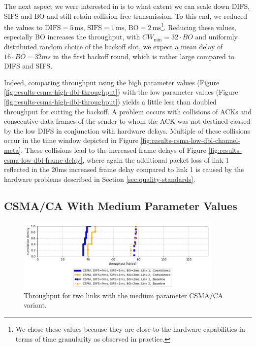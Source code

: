 The next aspect we were interested in is to what extent we can scale down DIFS, SIFS and BO and still retain collision-free transmission. To this end, we reduced the values to $\text{DIFS}=5 \,\text{ms}$, $\text{SIFS}=1 \,\text{ms}$, $\text{BO}=2 \,\text{ms}$\footnote{We chose these values because they are close to the hardware capabilities in terms of time granularity as observed in practice.}. Reducing these values, especially BO increases the throughput, with $CW_\text{min} = 32 \cdot BO$ and uniformly distributed random choice of the backoff slot, we expect a mean delay of $16\cdot BO=32ms$ in the first backoff round, which is rather large compared to DIFS and SIFS.

 Indeed, comparing throughput using the high parameter values (Figure \ref{fig:results-csma-high-dbl-throughput}) with the low parameter values (Figure \ref{fig:results-csma-high-dbl-throughput}) yields a little less than doubled throughput for cutting the backoff. 
 A problem occurs with collisions of ACKs and consecutive data frames of the sender to whom the ACK was not destined caused by the low DIFS in conjunction with hardware delays. Multiple of these collisions occur in the time window depicted in Figure \ref{fig:results-csma-low-dbl-channel-meta}. These collisions lead to the increased frame delays of Figure \ref{fig:results-csma-low-dbl-frame-delay}, where again the additional packet loss of link 1 reflected in the 20ms increased frame delay compared to link 1 is caused by the hardware problems described in Section \ref{sec:quality-standards}.

\clearpage

\subsection{CSMA/CA With Medium Parameter Values}

\begin{figure}[tb]
	\label{fig:results-csma-med-dbl-throughput}
	\begin{center}
		\includegraphics[width=0.9\textwidth]{pictures/results/same_combinations/csma_med_params/throughput_cdf}
	\end{center}
	\caption{Throughput for two links with the medium parameter CSMA/CA variant.}
\end{figure}

